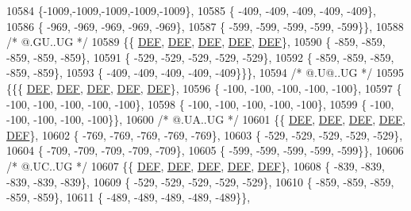 \begin{DoxyCode}
10584 \{-1009,-1009,-1009,-1009,-1009\},
10585 \{ -409, -409, -409, -409, -409\},
10586 \{ -969, -969, -969, -969, -969\},
10587 \{ -599, -599, -599, -599, -599\}\},
10588 \textcolor{comment}{/*  @.GU..UG */}
10589 \{\{  \mbox{\hyperlink{1_88_84__epars_8h_a397419fc12b37ed479c8abb9d444d843}{DEF}},  \mbox{\hyperlink{1_88_84__epars_8h_a397419fc12b37ed479c8abb9d444d843}{DEF}},  \mbox{\hyperlink{1_88_84__epars_8h_a397419fc12b37ed479c8abb9d444d843}{DEF}},  \mbox{\hyperlink{1_88_84__epars_8h_a397419fc12b37ed479c8abb9d444d843}{DEF}},  \mbox{\hyperlink{1_88_84__epars_8h_a397419fc12b37ed479c8abb9d444d843}{DEF}}\},
10590 \{ -859, -859, -859, -859, -859\},
10591 \{ -529, -529, -529, -529, -529\},
10592 \{ -859, -859, -859, -859, -859\},
10593 \{ -409, -409, -409, -409, -409\}\}\},
10594 \textcolor{comment}{/*  @.U@..UG */}
10595 \{\{\{  \mbox{\hyperlink{1_88_84__epars_8h_a397419fc12b37ed479c8abb9d444d843}{DEF}},  \mbox{\hyperlink{1_88_84__epars_8h_a397419fc12b37ed479c8abb9d444d843}{DEF}},  \mbox{\hyperlink{1_88_84__epars_8h_a397419fc12b37ed479c8abb9d444d843}{DEF}},  \mbox{\hyperlink{1_88_84__epars_8h_a397419fc12b37ed479c8abb9d444d843}{DEF}},  \mbox{\hyperlink{1_88_84__epars_8h_a397419fc12b37ed479c8abb9d444d843}{DEF}}\},
10596 \{ -100, -100, -100, -100, -100\},
10597 \{ -100, -100, -100, -100, -100\},
10598 \{ -100, -100, -100, -100, -100\},
10599 \{ -100, -100, -100, -100, -100\}\},
10600 \textcolor{comment}{/*  @.UA..UG */}
10601 \{\{  \mbox{\hyperlink{1_88_84__epars_8h_a397419fc12b37ed479c8abb9d444d843}{DEF}},  \mbox{\hyperlink{1_88_84__epars_8h_a397419fc12b37ed479c8abb9d444d843}{DEF}},  \mbox{\hyperlink{1_88_84__epars_8h_a397419fc12b37ed479c8abb9d444d843}{DEF}},  \mbox{\hyperlink{1_88_84__epars_8h_a397419fc12b37ed479c8abb9d444d843}{DEF}},  \mbox{\hyperlink{1_88_84__epars_8h_a397419fc12b37ed479c8abb9d444d843}{DEF}}\},
10602 \{ -769, -769, -769, -769, -769\},
10603 \{ -529, -529, -529, -529, -529\},
10604 \{ -709, -709, -709, -709, -709\},
10605 \{ -599, -599, -599, -599, -599\}\},
10606 \textcolor{comment}{/*  @.UC..UG */}
10607 \{\{  \mbox{\hyperlink{1_88_84__epars_8h_a397419fc12b37ed479c8abb9d444d843}{DEF}},  \mbox{\hyperlink{1_88_84__epars_8h_a397419fc12b37ed479c8abb9d444d843}{DEF}},  \mbox{\hyperlink{1_88_84__epars_8h_a397419fc12b37ed479c8abb9d444d843}{DEF}},  \mbox{\hyperlink{1_88_84__epars_8h_a397419fc12b37ed479c8abb9d444d843}{DEF}},  \mbox{\hyperlink{1_88_84__epars_8h_a397419fc12b37ed479c8abb9d444d843}{DEF}}\},
10608 \{ -839, -839, -839, -839, -839\},
10609 \{ -529, -529, -529, -529, -529\},
10610 \{ -859, -859, -859, -859, -859\},
10611 \{ -489, -489, -489, -489, -489\}\},

\end{DoxyCode}
